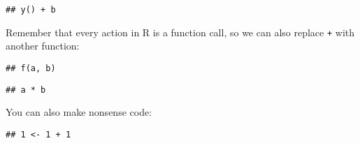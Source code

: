 \begin{Shaded}
\begin{Highlighting}[]
\OperatorTok{+}\StringTok{ }\NormalTok{(} \NormalTok{(}\NormalTok{())))}
\end{Highlighting}
\end{Shaded}

\begin{verbatim}
## y() + b
\end{verbatim}

Remember that every action in R is a function call, so we can also
replace \texttt{+} with another function:

\begin{Shaded}
\begin{Highlighting}[]
\OperatorTok{+}\StringTok{ }\NormalTok{(}\NormalTok{ =}\StringTok{ }
\end{Highlighting}
\end{Shaded}

\begin{verbatim}
## f(a, b)
\end{verbatim}

\begin{Shaded}
\begin{Highlighting}[]
\OperatorTok{+}\StringTok{ }\NormalTok{(}\NormalTok{ =}\StringTok{ }\NormalTok{(}\DataTypeTok{*}\NormalTok{)))}
\end{Highlighting}
\end{Shaded}

\begin{verbatim}
## a * b
\end{verbatim}

You can also make nonsense code:

\begin{Shaded}
\begin{Highlighting}[]
\StringTok{ }\OperatorTok{+}\StringTok{ }\NormalTok{, }\NormalTok{(} \NormalTok{))}
\end{Highlighting}
\end{Shaded}

\begin{verbatim}
## 1 <- 1 + 1
\end{verbatim}

